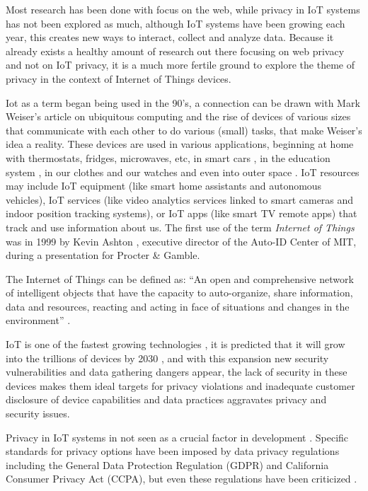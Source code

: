 \documentclass[conference]{IEEEtran}
\begin{document}
Most research has been done with focus on the web, while privacy in IoT
systems has not been explored as much, although IoT systems have been
growing each year, this creates new ways to interact,
collect and analyze data.
Because it already exists a healthy amount of research out there
focusing on web privacy and not on IoT privacy, it is a much more
fertile ground to explore the theme of privacy in the context of
Internet of Things devices.

Iot as a term began being used in the 90's, a connection can be drawn
with Mark Weiser's article on ubiquitous computing \cite{weiser1991computer} and the rise
of devices of various sizes that communicate with each other to do
various (small) tasks, that make Weiser's idea a reality. These devices are
used in various applications, beginning at home \cite{marikyan2019systematic} with thermostats,
fridges, microwaves, etc, in smart cars \cite{arena2020overview}, in the education system \cite{al2020survey},
in our clothes and our watches \cite{niknejad2020comprehensive} and even into outer space \cite{AkyildizInternet}.
IoT resources may include IoT equipment (like smart home assistants and
autonomous vehicles), IoT services (like video analytics services linked to
smart cameras and indoor position tracking systems), or IoT apps
(like smart TV remote apps) that track and use information about us.
The first use of the term \textit{Internet of Things} was in 1999 by Kevin Ashton \cite{KevinThat},
executive director of the Auto-ID Center of MIT, during a presentation for Procter \& Gamble.

The Internet of Things can be defined as: ``An open and
comprehensive network of intelligent objects that have the capacity to auto-organize,
share information, data and resources, reacting and acting in face of situations
and changes in the environment'' \cite{madakam2015internet}.

IoT is one of the fastest growing technologies \cite{MohammadState},
it is predicted that it will grow into the trillions of devices by 2030 \cite{SarawiInternet},
and with this expansion new security vulnerabilities and data gathering dangers appear, the lack
of security in these devices makes them ideal targets for privacy violations and inadequate
customer disclosure of device capabilities and data practices aggravates
privacy and security issues.

Privacy in IoT systems in not seen as a crucial factor in development \cite{alhirabi2021security}.
Specific standards for privacy options have been imposed by
data privacy regulations including the General Data Protection Regulation (GDPR)
and California Consumer Privacy Act (CCPA), but even these regulations have
been criticized \cite{peloquin2020disruptive, gladis2022weaponizing, gentile2022deficient, green2022flaws, byun2019privacy}.
\end{document}
